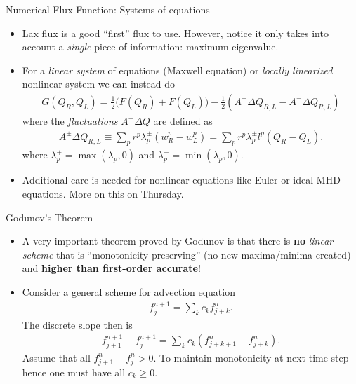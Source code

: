 \documentclass[aspectratio=169]{beamer}
\newcommand{\mypause}{}
\begin{document}
\begin{frame}{Numerical Flux Function: Systems of equations}
  \small%
  \begin{itemize}
  \item Lax flux is a good ``first'' flux to use. However, notice it
    only takes into account a \emph{single} piece of information:
    maximum eigenvalue.%
    \mypause%
  \item For a \emph{linear system} of equations (Maxwell equation) or
    \emph{locally linearized} nonlinear system we can instead do
    \begin{align*}
      G(Q_R,Q_L) = \frac{1}{2}\big(F(Q_R)+F(Q_L)\big) - \frac{1}{2}(A^+\Delta Q_{R,L} - A^-\Delta Q_{R,L})      
    \end{align*}
    where the \emph{fluctuations} $A^\pm\Delta Q$ are defined as
    \begin{align*}
      A^\pm\Delta Q_{R,L} \equiv \sum_p r^p \lambda^\pm_p (w_R^p-w_L^p) = \sum_p r^p \lambda^\pm_p l^p(Q_R-Q_L).
    \end{align*}
    where $\lambda_p^+ = \max(\lambda_p,0)$ and
    $\lambda_p^- = \min(\lambda_p,0)$.%
    \mypause%
  \item Additional care is needed for nonlinear equations like Euler
    or ideal MHD equations. More on this on Thursday.
  \end{itemize}
\end{frame}

\begin{frame}{Godunov's Theorem}
  \small%
  \begin{itemize}
  \item A very important theorem proved by Godunov is that there is {
      \bf no} \emph{linear scheme} that is ``monotonicity preserving''
    (no new maxima/minima created) and {\bf higher than first-order
      accurate}!  \mypause%
  \item Consider a general scheme for advection equation
    \begin{align*}
      f_j^{n+1} = \sum_k c_k f_{j+k}^n.
    \end{align*}
    The discrete slope then is
    \begin{align*}
      f_{j+1}^{n+1} - f_j^{n+1} = \sum_k c_k \left( f_{j+k+1}^n - f_{j+k}^n \right).
    \end{align*}
    Assume that all $f_{j+1}^n - f_j^n > 0$. To maintain monotonicity
    at next time-step hence one must have all $c_k \ge 0$.
  \end{itemize}
\end{frame}
\end{document}
